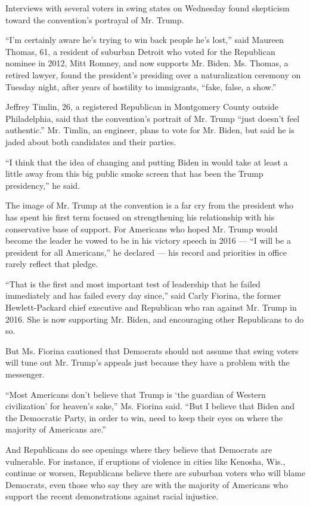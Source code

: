 Interviews with several voters in swing states on Wednesday found
skepticism toward the convention's portrayal of Mr. Trump.

``I'm certainly aware he's trying to win back people he's lost,'' said
Maureen Thomas, 61, a resident of suburban Detroit who voted for the
Republican nominee in 2012, Mitt Romney, and now supports Mr. Biden. Ms.
Thomas, a retired lawyer, found the president's presiding over a
naturalization ceremony on Tuesday night, after years of hostility to
immigrants, ``fake, false, a show.''

Jeffrey Timlin, 26, a registered Republican in Montgomery County outside
Philadelphia, said that the convention's portrait of Mr. Trump ``just
doesn't feel authentic.'' Mr. Timlin, an engineer, plans to vote for Mr.
Biden, but said he is jaded about both candidates and their parties.

``I think that the idea of changing and putting Biden in would take at
least a little away from this big public smoke screen that has been the
Trump presidency,'' he said.

The image of Mr. Trump at the convention is a far cry from the president
who has spent his first term focused on strengthening his relationship
with his conservative base of support. For Americans who hoped Mr. Trump
would become the leader he vowed to be in his victory speech in 2016 ---
``I will be a president for all Americans,'' he declared --- his record
and priorities in office rarely reflect that pledge.

``That is the first and most important test of leadership that he failed
immediately and has failed every day since,'' said Carly Fiorina, the
former Hewlett-Packard chief executive and Republican who ran against
Mr. Trump in 2016. She is now supporting Mr. Biden, and encouraging
other Republicans to do so.

But Ms. Fiorina cautioned that Democrats should not assume that swing
voters will tune out Mr. Trump's appeals just because they have a
problem with the messenger.

``Most Americans don't believe that Trump is `the guardian of Western
civilization' for heaven's sake,'' Ms. Fiorina said. ``But I believe
that Biden and the Democratic Party, in order to win, need to keep their
eyes on where the majority of Americans are.''

And Republicans do see openings where they believe that Democrats are
vulnerable. For instance, if eruptions of violence in cities like
Kenosha, Wis., continue or worsen, Republicans believe there are
suburban voters who will blame Democrats, even those who say they are
with the majority of Americans who support the recent demonstrations
against racial injustice.

